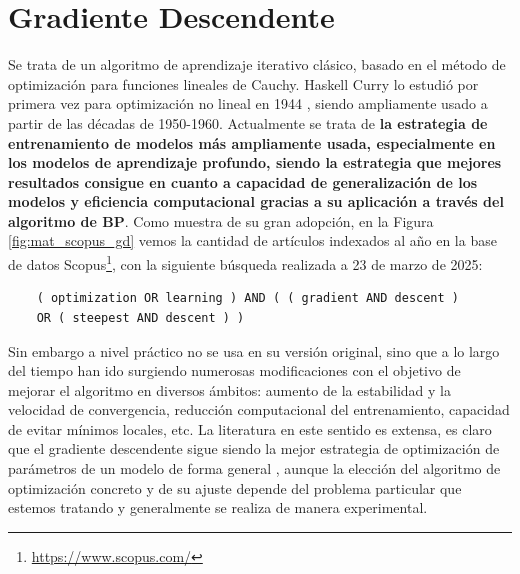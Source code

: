 \section{Gradiente Descendente}

Se trata de un algoritmo de aprendizaje iterativo clásico, basado en el método de optimización para funciones lineales de Cauchy. Haskell Curry lo estudió por primera vez para optimización no lineal en 1944 \cite{Curry1944GDNoLin}, siendo ampliamente usado a partir de las décadas de 1950-1960. Actualmente se trata de \textbf{la estrategia de entrenamiento de modelos más ampliamente usada, especialmente en los modelos de aprendizaje profundo, siendo la estrategia que mejores resultados consigue en cuanto a capacidad de generalización de los modelos y eficiencia computacional gracias a su aplicación a través del algoritmo de BP}. Como muestra de su gran adopción, en la Figura \ref{fig:mat_scopus_gd} vemos la cantidad de artículos indexados al año en la base de datos Scopus\footnote{\url{https://www.scopus.com/}}, con la siguiente búsqueda realizada a 23 de marzo de 2025:

\begin{verbatim}
	( optimization OR learning ) AND ( ( gradient AND descent ) 
	OR ( steepest AND descent ) )
\end{verbatim}





Sin embargo a nivel práctico no se usa en su versión original, sino que a lo largo del tiempo han ido surgiendo numerosas modificaciones con el objetivo de mejorar el algoritmo en diversos ámbitos: aumento de la estabilidad y la velocidad de convergencia, reducción computacional del entrenamiento, capacidad de evitar mínimos locales, etc. La literatura en este sentido es extensa, es claro que el gradiente descendente sigue siendo la mejor estrategia de optimización de parámetros de un modelo de forma general \cite{MHtrainingClase}, aunque la elección del algoritmo de optimización concreto y de su ajuste depende del problema particular que estemos tratando y generalmente se realiza de manera experimental. 


